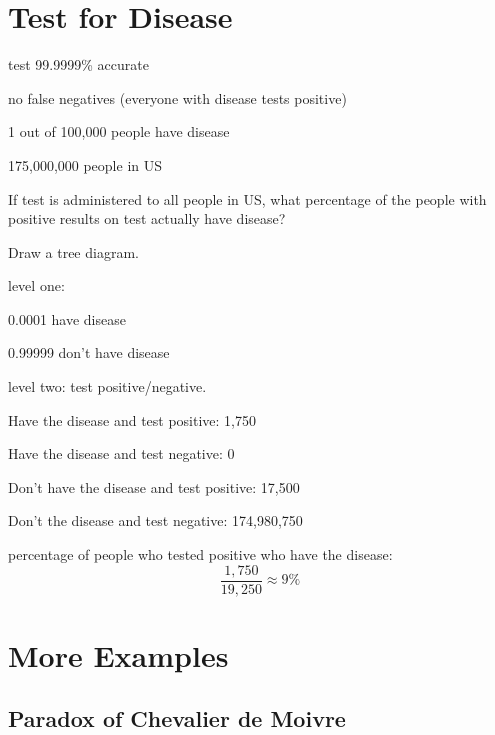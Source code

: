 \documentclass[letterpaper, landscape]{exam}
\begin{document}
  \section{Test for Disease}

  \begin{itemize*}
    \item test 99.9999\% accurate
    \item no false negatives (everyone with disease tests positive)
    \item 1 out of 100,000 people have disease
    \item 175,000,000 people in US
  \end{itemize*}

  If test is administered to all people in US, what percentage of the people
  with positive results on test actually have disease?


  \begin{solution}
    Draw a tree diagram.

    level one:
    \begin{itemize*}
      \item 0.0001 have disease
      \item 0.99999 don't have disease
    \end{itemize*}

    level two: test positive/negative. 
    \begin{itemize*}
      \item Have the disease and test positive: 1,750
      \item Have the disease and test negative: 0
      \item Don't have the disease and test positive: 17,500
      \item Don't the disease and test negative: 174,980,750
    \end{itemize*}

    percentage of people who tested positive who have the disease:
    \[
      \frac{1,750}{19,250} \approx 9\%
    \]

  \end{solution}
  \section{More Examples}

  \subsection{Paradox of Chevalier de Moivre}
\end{document}
